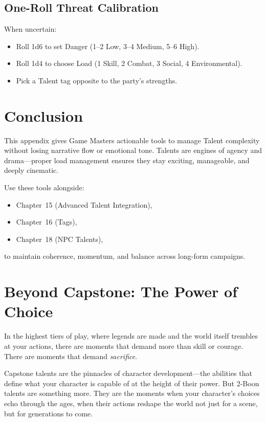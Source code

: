 \documentclass[11pt]{book}
\begin{document}
\subsection{One-Roll Threat Calibration}

When uncertain:
\begin{itemize}
    \item Roll 1d6 to set Danger (1--2 Low, 3--4 Medium, 5--6 High).
    \item Roll 1d4 to choose Load (1 Skill, 2 Combat, 3 Social, 4 Environmental).
    \item Pick a Talent tag opposite to the party's strengths.
\end{itemize}

\section{Conclusion}

This appendix gives Game Masters actionable tools to manage Talent complexity
without losing narrative flow or emotional tone.
Talents are engines of agency and drama---proper load management ensures they stay exciting, manageable, and deeply cinematic.

Use these tools alongside:
\begin{itemize}
    \item Chapter~15 (Advanced Talent Integration),
    \item Chapter~16 (Tags),
    \item Chapter~18 (NPC Talents),
\end{itemize}
to maintain coherence, momentum, and balance across long-form campaigns.


\section*{Beyond Capstone: The Power of Choice}

In the highest tiers of play, where legends are made and the world itself trembles at your actions, there are moments that demand more than skill or courage. There are moments that demand \emph{sacrifice}.

Capstone talents are the pinnacles of character development---the abilities that define what your character is capable of at the height of their power. But 2-Boon talents are something more. They are the moments when your character's choices echo through the ages, when their actions reshape the world not just for a scene, but for generations to come.
\end{document}
